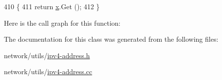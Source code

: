 \begin{DoxyCode}
410 \{ 
411   \textcolor{keywordflow}{return} \hyperlink{lte__link__budget__x2__handover__measures_8m_a9336ebf25087d91c818ee6e9ec29f8c1}{x}.Get ();
412 \}
\end{DoxyCode}


Here is the call graph for this function\+:




The documentation for this class was generated from the following files\+:\begin{DoxyCompactItemize}
\item 
network/utils/\hyperlink{ipv4-address_8h}{ipv4-\/address.\+h}\item 
network/utils/\hyperlink{ipv4-address_8cc}{ipv4-\/address.\+cc}\end{DoxyCompactItemize}
